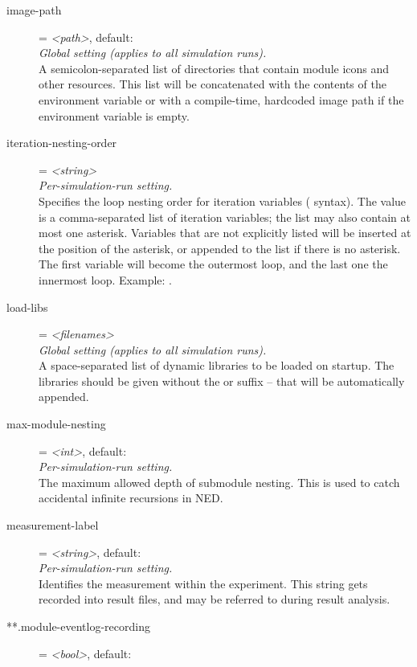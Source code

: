 \begin{description}
\item[image-path] = \textit{<path>}, default: \\
    \textit{Global setting (applies to all simulation runs).}\\
    A semicolon-separated list of directories that contain module icons and
    other resources. This list will be concatenated with the contents of the
     environment variable or with a compile-time,
    hardcoded image path if the environment variable is empty.
\item[iteration-nesting-order] = \textit{<string>}\\
    \textit{Per-simulation-run setting.}\\
    Specifies the loop nesting order for iteration variables
    (\ttt{\$\{{\allowbreak}\}{\allowbreak}} syntax). The value is a
    comma-separated list of iteration variables; the list may also contain at
    most one asterisk. Variables that are not explicitly listed will be
    inserted at the position of the asterisk, or appended to the list if there
    is no asterisk. The first variable will become the outermost loop, and the
    last one the innermost loop. Example:
    .
\item[load-libs] = \textit{<filenames>}\\
    \textit{Global setting (applies to all simulation runs).}\\
    A space-separated list of dynamic libraries to be loaded on startup. The
    libraries should be given without the  or
     suffix -- that will be automatically appended.
\item[max-module-nesting] = \textit{<int>}, default: \\
    \textit{Per-simulation-run setting.}\\
    The maximum allowed depth of submodule nesting. This is used to catch
    accidental infinite recursions in NED.
\item[measurement-label] = \textit{<string>}, default: \\
    \textit{Per-simulation-run setting.}\\
    Identifies the measurement within the experiment. This string gets recorded
    into result files, and may be referred to during result analysis.
\item[**.module-eventlog-recording] = \textit{<bool>}, default: \\

\end{description}
